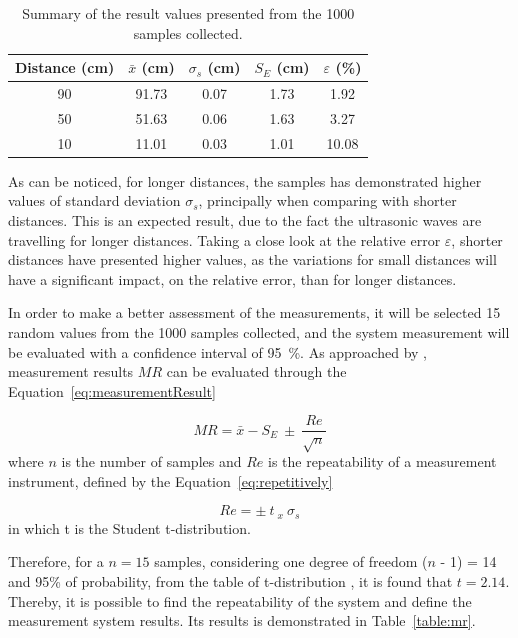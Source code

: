 \begin{table}[h!]
    \centering
    \begin{tabular}{@{}ccccc@{}}
        \toprule
        \textbf{Distance (cm)} & \textbf{$\bar{x}$} (cm)& \textbf{$\sigma_s$} (cm) & \textbf{$S_E$} (cm) & \textbf{$\varepsilon$} (\%)\\ \midrule
        \rowcolor[HTML]{EFEFEF} 
        90 & 91.73 & 0.07 & 1.73 & 1.92 \\
        50 & 51.63 & 0.06 & 1.63 & 3.27 \\
        \rowcolor[HTML]{EFEFEF} 
        10 & 11.01 & 0.03 & 1.01 & 10.08 \\ \bottomrule
    \end{tabular}
    \caption{Summary of the result values presented from the 1000 samples collected.}
    \label{table:samples1000}
\end{table}

As can be noticed, for longer distances, the samples has demonstrated higher values of standard deviation $\sigma_s$, principally when comparing with shorter distances. This is an expected result, due to the fact the ultrasonic waves are travelling for longer distances. Taking a close look at the relative error $\varepsilon$, shorter distances have presented higher values, as the variations for small distances will have a significant impact, on the relative error, than for longer distances. 

In order to make a better assessment of the measurements, it will be selected 15 random values from the 1000 samples collected, and the system measurement will be evaluated with a confidence interval of 95~\%. As approached by \cite{NETO:2012}, measurement results $MR$ can be evaluated through the Equation~\ref{eq:measurementResult}

\begin{equation}\label{eq:measurementResult}
    MR = \bar{x} - S_E~\pm~\frac{Re}{\sqrt{n}}
\end{equation}
where $n$ is the number of samples and $Re$ is the repeatability of a measurement instrument, defined by the Equation~\ref{eq:repetitively}

\begin{equation}\label{eq:repetitively}
    Re = \pm~t~_x~\sigma_s
\end{equation}
in which t is the Student t-distribution.

Therefore, for a $n = 15$ samples, considering one degree of freedom ($n$ - 1) = 14 and 95\% of probability, from the table of t-distribution \cite{NETO:2012}, it is found that $t = 2.14$. Thereby, it is possible to find the repeatability of the system and define the measurement system results. Its results is demonstrated in Table~\ref{table:mr}.

